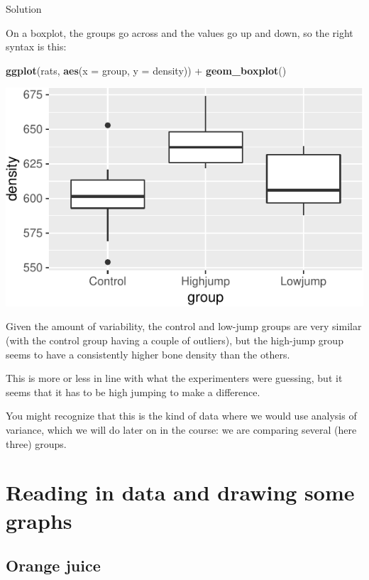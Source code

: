 \documentclass[]{tufte-book}
\newenvironment{Shaded}{}{}
\newcommand{\DataTypeTok}[1]{\textcolor[rgb]{0.56,0.13,0.00}{#1}}
\newcommand{\KeywordTok}[1]{\textcolor[rgb]{0.00,0.44,0.13}{\textbf{#1}}}
\newcommand{\NormalTok}[1]{#1}
\newcommand{\OperatorTok}[1]{\textcolor[rgb]{0.40,0.40,0.40}{#1}}
\newcommand{\StringTok}[1]{\textcolor[rgb]{0.25,0.44,0.63}{#1}}
\theoremstyle{definition}
\theoremstyle{definition}
\theoremstyle{definition}
\theoremstyle{remark}
\begin{document}
Solution

On a boxplot, the groups go across and the values go up and down, so the
right syntax is this:

\begin{Shaded}
\begin{Highlighting}[]
\KeywordTok{ggplot}\NormalTok{(rats, }\KeywordTok{aes}\NormalTok{(}\DataTypeTok{x =}\NormalTok{ group, }\DataTypeTok{y =}\NormalTok{ density)) }\OperatorTok{+}\StringTok{ }\KeywordTok{geom_boxplot}\NormalTok{()}
\end{Highlighting}
\end{Shaded}

\includegraphics{01-getting-used_files/figure-latex/unnamed-chunk-14-1}

Given the amount of variability, the control and low-jump groups are
very similar (with the control group having a couple of outliers), but
the high-jump group seems to have a consistently higher bone density
than the others.

This is more or less in line with what the experimenters were guessing,
but it seems that it has to be high jumping to make a difference.

You might recognize that this is the kind of data where we would use
analysis of variance, which we will do later on in the course: we are
comparing several (here three) groups.

\hypertarget{reading-in-data-and-drawing-some-graphs}{%
\chapter{Reading in data and drawing some
graphs}\label{reading-in-data-and-drawing-some-graphs}}

\hypertarget{orange-juice}{%
\section{Orange juice}\label{orange-juice}}
\end{document}

